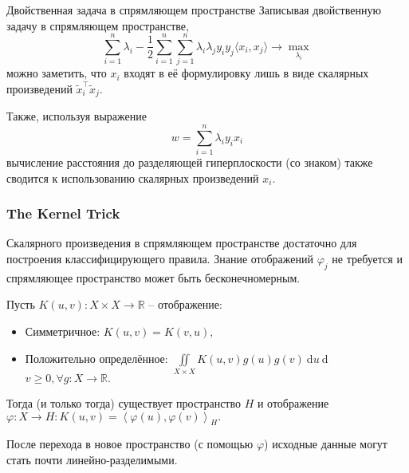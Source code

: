 \documentclass[11pt]{beamer}
\begin{document}
\begin{frame}{Двойственная задача в спрямляющем пространстве}
	Записывая двойственную задачу в спрямляющем пространстве,
	$$
	\sum\limits_{i=1}^{n}\lambda_i - \frac{1}{2}\sum\limits_{i=1}^n\sum\limits_{j=1}^n\lambda_i\lambda_jy_iy_j\langle x_i,  x_j \rangle \rightarrow \max\limits_{\lambda_i} 
	$$
	можно заметить, что ${x}_i$ входят в её формулировку лишь в виде скалярных произведений $\tilde{x}_i^\intercal \tilde{x}_j$.
	
	Также, используя выражение
	$$w = \sum\limits_{i=1}^{n}\lambda_i y_i {x}_i$$
	вычисление расстояния до разделяющей гиперплоскости (со знаком)	также сводится к использованию скалярных произведений ${x}_i$.
	
\end{frame}
\begin{frame}
	\frametitle{The Kernel Trick}
	Скалярного произведения в спрямляющем пространстве достаточно для построения классифицирующего правила. Знание отображений $\varphi_j$ не требуется и спрямляющее пространство может быть бесконечномерным.
	
	Пусть $K\left(u,v\right):X\times X\rightarrow \mathbb{R}$ -- отображение:
	\begin{itemize}
		\item Симметричное: $K\left(u, v\right)=K\left(v, u\right),$
		\item Положительно определённое: $\iint\limits_{X\times X}K\left(u,v\right)g\left(u\right)g\left(v\right) \ $d${u} \ $d${v} \geq 0, \forall g:X\rightarrow \mathbb{R}.$
	\end{itemize}
	
	Тогда (и только тогда) существует пространство $H$ и отображение $\varphi:X\rightarrow H: K\left(u,v\right)=\left\langle\varphi\left(u\right), \varphi\left(v\right)\right\rangle_H.$
	
	После перехода в новое пространство (с помощью $\varphi$) исходные данные могут стать почти линейно-разделимыми.
	
\end{frame}
\end{document}
